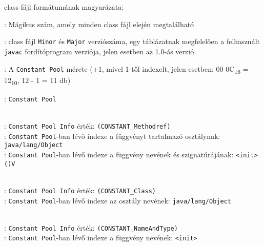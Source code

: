 class fájl formátumának magyarázata:

\begin{compactitem}
\setlength\itemsep{-5px}
\item {}: Mágikus szám, amely minden class fájl elején megtalálható
\item {} : class fájl \lstinline{Minor} és \lstinline{Major} verziószáma, egy táblázatnak megfelelően a felhasznált \lstinline{javac} fordítóprogram verziója, jelen esetben az 1.0-ás verzió
\item {}: A \lstinline{Constant Pool} mérete (+1, mivel 1-től indexelt, jelen esetben: 00 0C\textsubscript{16} = 12\textsubscript{10}, 12 - 1 = 11 db)
\item {}: \lstinline{Constant Pool}
\begin{compactitem}
    \setlength\itemsep{-5px}
    \item {}   \\
    : \lstinline{Constant Pool Info} érték: \lstinline{(CONSTANT_Methodref)} \\
    : \lstinline{Constant Pool}-ban lévő indexe a függvényt tartalmazó osztálynak: \lstinline{java/lang/Object} \\
    : \lstinline{Constant Pool}-ban lévő indexe a függvény nevének és szignatúrájának: \lstinline{<init> ()V}
    \item {}  \\
    : \lstinline{Constant Pool Info} érték: \lstinline{(CONSTANT_Class)} \\
    : \lstinline{Constant Pool}-ban lévő indexe az osztály nevének: \lstinline{java/lang/Object}
    \item {}   \\
    : \lstinline{Constant Pool Info} érték: \lstinline{(CONSTANT_NameAndType)} \\
    : \lstinline{Constant Pool}-ban lévő indexe a függvény nevének: \lstinline{<init>} \\

\end{compactitem}
\end{compactitem}
